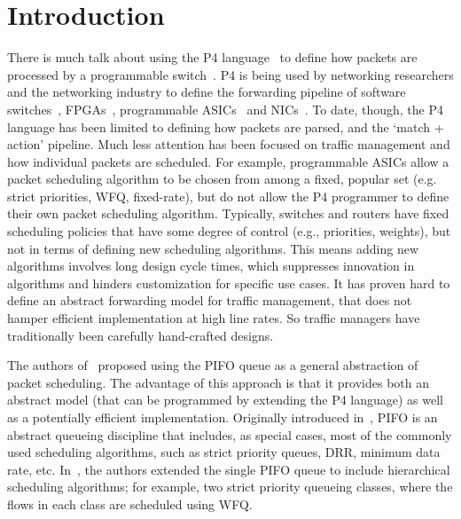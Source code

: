 \section{Introduction}


There is much talk about using the P4 language~\cite{p4:2014} to define how packets are processed by a programmable switch~\cite{p4org, p4runtime, Stratum}. P4 is being used by networking researchers and the networking industry to define the forwarding pipeline of software switches~\cite{Pisces}, FPGAs~\cite{SDNet}, programmable ASICs~\cite{Tofino, Xpliant} and NICs~\cite{Netronome}. To date, though, the P4 language has been limited to defining how packets are parsed, and the `match + action' pipeline. Much less attention has been focused on traffic management and how individual packets are scheduled. For example, programmable ASICs allow a packet scheduling algorithm to be chosen from among a fixed, popular set (e.g. strict priorities, WFQ, fixed-rate), but do not allow the P4 programmer to define their own packet scheduling algorithm. Typically, switches and routers have fixed scheduling policies that have some degree of control (e.g., priorities, weights), but not in terms of defining new scheduling algorithms.  This means adding new algorithms involves long design cycle times, which suppresses innovation in algorithms and hinders customization for specific use cases. It has proven hard to define an abstract forwarding model for traffic management, that does not hamper efficient implementation at high line rates.  So traffic managers have traditionally been carefully hand-crafted designs.

The authors of~\cite{pifo2016} proposed using the PIFO queue as a general abstraction of packet scheduling. The advantage of this approach is that it provides both an abstract model (that can be programmed by extending the P4 language) as well as a potentially efficient implementation. Originally introduced in~\cite{pifo1999}, PIFO is an abstract queueing discipline that includes, as special cases, most of the commonly used scheduling algorithms, such as strict priority queues, DRR, minimum data rate, etc. In~\cite{pifo2016}, the authors extended the single PIFO queue to include hierarchical scheduling algorithms; for example, two strict priority queueing classes, where the flows in each class are scheduled using WFQ. 

